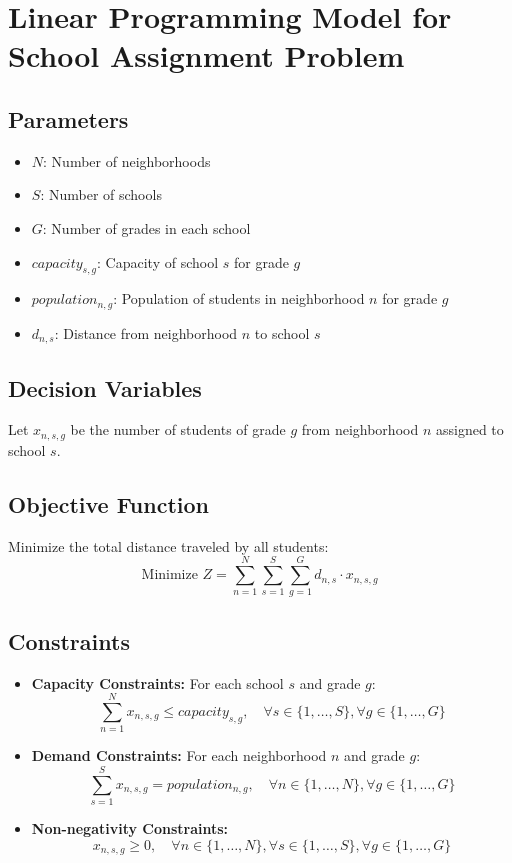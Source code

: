 \documentclass{article}
\begin{document}
\section*{Linear Programming Model for School Assignment Problem}

\subsection*{Parameters}
\begin{itemize}
    \item $N$: Number of neighborhoods
    \item $S$: Number of schools
    \item $G$: Number of grades in each school
    \item $capacity_{s,g}$: Capacity of school $s$ for grade $g$
    \item $population_{n,g}$: Population of students in neighborhood $n$ for grade $g$
    \item $d_{n,s}$: Distance from neighborhood $n$ to school $s$
\end{itemize}

\subsection*{Decision Variables}
Let $x_{n,s,g}$ be the number of students of grade $g$ from neighborhood $n$ assigned to school $s$.

\subsection*{Objective Function}
Minimize the total distance traveled by all students:
\[
\text{Minimize } Z = \sum_{n=1}^{N} \sum_{s=1}^{S} \sum_{g=1}^{G} d_{n,s} \cdot x_{n,s,g}
\]

\subsection*{Constraints}
\begin{itemize}
    \item \textbf{Capacity Constraints:} For each school $s$ and grade $g$:
    \[
    \sum_{n=1}^{N} x_{n,s,g} \leq capacity_{s,g}, \quad \forall s \in \{1, \ldots, S\}, \forall g \in \{1, \ldots, G\}
    \]
    
    \item \textbf{Demand Constraints:} For each neighborhood $n$ and grade $g$:
    \[
    \sum_{s=1}^{S} x_{n,s,g} = population_{n,g}, \quad \forall n \in \{1, \ldots, N\}, \forall g \in \{1, \ldots, G\}
    \]
    
    \item \textbf{Non-negativity Constraints:}
    \[
    x_{n,s,g} \geq 0, \quad \forall n \in \{1, \ldots, N\}, \forall s \in \{1, \ldots, S\}, \forall g \in \{1, \ldots, G\}
    \]
\end{itemize}
\end{document}
